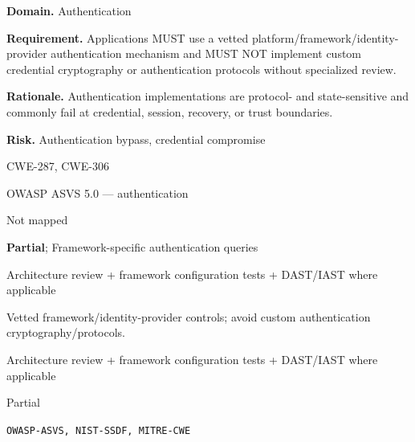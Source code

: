 \documentclass[10pt,letterpaper]{article}
\newcommand{\prioritybadge}[2]{\tcbox[on line,boxrule=0pt,arc=1.2mm,boxsep=0.7mm,left=1mm,right=1mm,top=0.4mm,bottom=0.4mm,colback=#2!12,coltext=#2]{\scriptsize\bfseries #1}}
\begin{document}
\begin{rulebox}[title={\texttt{SCS-ALL-AUTHN-001} \hfill \prioritybadge{Critical Control}{Critical}}]
\textbf{Domain.} Authentication

\textbf{Requirement.} Applications MUST use a vetted platform/framework/identity-provider authentication mechanism and MUST NOT implement custom credential cryptography or authentication protocols without specialized review.

\textbf{Rationale.} Authentication implementations are protocol- and state-sensitive and commonly fail at credential, session, recovery, or trust boundaries.

\textbf{Risk.} Authentication bypass, credential compromise

\begin{description}[leftmargin=2.65cm,labelwidth=2.3cm,style=nextline,itemsep=1pt,topsep=3pt]
  \item[CWE] CWE-287, CWE-306
  \item[OWASP] OWASP ASVS 5.0 --- authentication
  \item[CERT] Not mapped
  \item[CodeQL] \textbf{Partial}; Framework-specific authentication queries
  \item[Enforcement] Architecture review + framework configuration tests + DAST/IAST where applicable
  \item[Prevention] Vetted framework/identity-provider controls; avoid custom authentication cryptography/protocols.
  \item[Verification] Architecture review + framework configuration tests + DAST/IAST where applicable
  \item[Automation] Partial
  \item[Sources] \texttt{OWASP-ASVS, NIST-SSDF, MITRE-CWE}
\end{description}
\end{rulebox}
\end{document}
